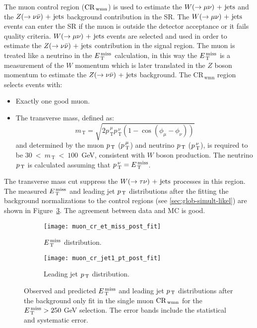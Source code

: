 The muon control region ($\mathrm{CR}_\mathrm{\, wmn}$) is used to estimate the $W (\rightarrow \mu \nu)\mathrm{~+~jets}$ and
the $Z (\rightarrow \nu \bar{\nu})\mathrm{~+~jets}$ background contribution in the SR\@. The $W (\rightarrow \mu \nu)\mathrm{~+~jets}$
events can enter the SR if the muon is outside the detector acceptance or it
fails quality criteria. $W (\rightarrow \mu \nu)\mathrm{~+~jets}$ events are selected and used in order
to estimate the $Z (\rightarrow \nu \bar{\nu})\mathrm{~+~jets}$ contribution in the signal region. The muon is
treated like a neutrino in the $E_\mathrm{\, T}^\mathrm{\, miss}$ calculation, in this way the $E_\mathrm{\, T}^\mathrm{\, miss}$ is a
measurement of the $W$ momentum which is later translated in the $Z$ boson
momentum to estimate the $Z (\rightarrow \nu \bar{\nu})\mathrm{~+~jets}$ background. The CR$_{\mathrm{\, wmn}}$
region selects events with:
\begin{itemize}
\item Exactly one good muon.
\item The transverse mass, defined as:
  \begin{equation}
    \label{eq:82}
    m_\mathrm{\, T} = \sqrt{2 p_\mathrm{\, T}^{\, \mu} p_\mathrm{\, T}^{\, \nu}
      (1 - \cos(\phi_\mu - \phi_\nu))}
  \end{equation}
  and determined by the muon $p_\mathrm{\, T}$ ($p_\mathrm{\, T}^{\, \mu}$) and neutrino $p_\mathrm{\, T}$
  ($p_\mathrm{\, T}^{\, \nu}$), is required to be $30~<~m_\mathrm{\, T}~<~100$~GeV,
  consistent with $W$ boson production. The neutrino $p_\mathrm{\, T}$ is calculated
  assuming that $p_\mathrm{\, T}^{\, \nu} = E_\mathrm{\, T}^\mathrm{\, miss}$.
\end{itemize}
The transverse mass cut suppress the $W (\rightarrow \tau \nu)\mathrm{~+~jets}$ processes in this
region. The measured $E_\mathrm{\, T}^\mathrm{\, miss}$ and leading jet $p_\mathrm{\, T}$ distributions after the
fitting the background normalizations to the control regions (see
\cref{sec:glob-simult-likel}) are shown in Figure~\ref{fig:muon_cr_plots}. The
agreement between data and MC is good.
\begin{figure}[!h]
  \centering
  \begin{subfigure}[t]{.48\linewidth}
    \texttt{[image: muon\_cr\_et\_miss\_post\_fit]}
    \caption{$E_\mathrm{\, T}^\mathrm{\, miss}$ distribution.}
    \label{fig:muon_cr_et_miss_pre_fit}
  \end{subfigure}
  \begin{subfigure}[t]{.48\linewidth}
    \texttt{[image: muon\_cr\_jet1\_pt\_post\_fit]}
    \caption{Leading jet $p_\mathrm{\, T}$ distribution.}
    \label{fig:muon_cr_jet1_pt_pre_fit}
  \end{subfigure}
  \caption{Observed and predicted $E_\mathrm{\, T}^\mathrm{\, miss}$ and leading jet $p_\mathrm{\, T}$ distributions
    after the background only fit in the single muon $\mathrm{CR}_\mathrm{\, wmn}$ for the
    $E_\mathrm{\, T}^\mathrm{\, miss} > 250~$GeV selection. The error bands include the statistical and
    systematic error.}
  \label{fig:muon_cr_plots}
\end{figure}
